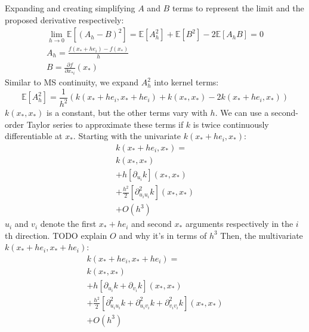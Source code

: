 Expanding and creating simplifying $A$ and $B$ terms to represent the limit and the proposed derivative respectively:
\begin{equation*}
    \begin{aligned}
        \lim_{h \to 0} \mathbb{E} \left[(A_h - B)^2\right] = \mathbb{E}[A_h^2] + \mathbb{E}[B^2] - 2\mathbb{E}[A_h B] = 0 \\
        A_h = \frac{f(x_* + h e_i) - f(x_*)}{h} \\
        B = \frac{\partial f}{\partial x_{*i}}(x_*)
    \end{aligned}
\end{equation*}
Similar to MS continuity, we expand $A_h^2$ into kernel terms:
\begin{equation} \label{eq:msd_a}
    \mathbb{E}[A_h^2] = \frac{1}{h^2} \left( k(x_* + h e_i, x_* + h e_i) + k(x_*, x_*) - 2k(x_* + h e_i, x_*) \right)
\end{equation}
$k(x_*,x_*)$ is a constant, but the other terms vary with $h$. We can use a second-order Taylor series to approximate these terms if $k$ is twice continuously differentiable at $x_*$. Starting with the univariate $k(x_* + h e_i, x_*)$:
\begin{equation*}
    \begin{aligned}
        k(x_* + h e_i, x_*) = \\
        k(x_*, x_*) \\
        + h [\partial_{u_i}k](x_*, x_*) \\
        + \frac{h^2}{2} [\partial_{u_i u_i}^2k] (x_*, x_*) \\
        + O(h^3)
    \end{aligned}
\end{equation*}
$u_i$ and $v_i$ denote the first $x_* + h e_i$ and second $x_*$ arguments respectively in the $i$th direction. TODO explain $O$ and why it's in terms of $h^3$
Then, the multivariate $k(x_* + h e_i, x_* + h e_i)$:
\begin{equation*}
    \begin{aligned}
        k(x_* + h e_i, x_* + h e_i) = \\
        k(x_*, x_*) \\
        + h [\partial_{u_i}k + \partial_{v_i}k](x_*, x_*) \\
        + \frac{h^2}{2} [\partial_{u_i u_i}^2 k + \partial_{u_i v_i}^2 k + \partial_{v_i v_i}^2 k](x_*, x_*) \\
        + O(h^3) 
    \end{aligned}
\end{equation*}
